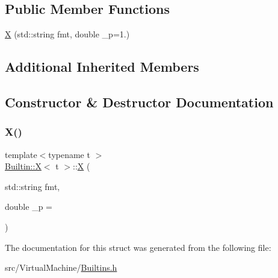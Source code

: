 \subsection*{Public Member Functions}
\begin{DoxyCompactItemize}
\item 
\hyperlink{struct_builtin_1_1_x_abdc687c87535bd42dfe922ff3faf428d}{X} (std\+::string fmt, double \+\_\+p=1.)
\end{DoxyCompactItemize}
\subsection*{Additional Inherited Members}


\subsection{Constructor \& Destructor Documentation}
\mbox{\label{struct_builtin_1_1_x_abdc687c87535bd42dfe922ff3faf428d}} 
\subsubsection{\texorpdfstring{X()}{X()}}
{\footnotesize\ttfamily template$<$typename t $>$ \\
\hyperlink{struct_builtin_1_1_x}{Builtin\+::X}$<$ t $>$\+::\hyperlink{struct_builtin_1_1_x}{X} (\begin{DoxyParamCaption}\item[{std\+::string}]{fmt,  }\item[{double}]{\+\_\+p = {} }\end{DoxyParamCaption})\hspace{0.3cm}{\ttfamily [inline]}}



The documentation for this struct was generated from the following file\+:\begin{DoxyCompactItemize}
\item 
src/\+Virtual\+Machine/\hyperlink{_builtins_8h}{Builtins.\+h}\end{DoxyCompactItemize}

